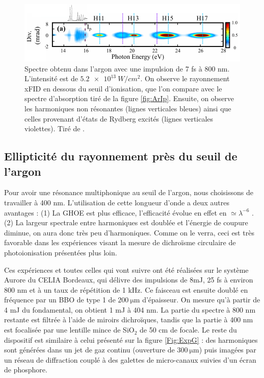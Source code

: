 \begin{figure}[!ht]
\centering
\includegraphics[width=1.1\columnwidth]{Figures/ResonantArgon/xFID.pdf}%
\caption{Spectre obtenu dans l'argon avec une impulsion de 7 fs à 800 nm. L'intensité est de $\SI{5.2e13}{W/cm^2}$. On observe le rayonnement xFID en dessous du seuil d'ionisation, que l'on compare avec le spectre d'absorption tiré de la figure \ref{fig:ArIp}. Ensuite, on observe les harmoniques non résonantes (lignes verticales bleues) ainsi que celles provenant d'états de Rydberg excités (lignes verticales violettes). Tiré de .}
\label{fig:xFID}
\end{figure}



\subsection{Ellipticité du rayonnement près du seuil de l'argon}
\label{sec:resonant_argon_exp}
Pour avoir une résonance multiphonique au seuil de l'argon, nous choisissons de travailler à 400 nm. L'utilisation de cette longueur d'onde a deux autres avantages : (1) La GHOE est plus efficace, l'efficacité évolue en effet en $\simeq\lambda^{-6}$ . (2) La largeur spectrale entre harmoniques est doublée et l'énergie de coupure diminue, on aura donc très peu d'harmoniques. Comme on le verra, ceci est très favorable dans les expériences visant la mesure de dichroïsme circulaire de photoionisation présentées plus loin. 

Ces expériences et toutes celles qui vont suivre ont été réalisées sur le système Aurore du CELIA Bordeaux, qui délivre des impulsions de 8mJ, 25 fs à environ 800 nm et à un taux de répétition de 1 kHz. Ce faisceau est ensuite doublé en fréquence par un BBO de type 1 de $\SI{200}{\micro\meter}$ d'épaisseur. On mesure qu'à partir de 4 mJ du fondamental, on obtient 1 mJ à 404 nm. La partie du spectre à 800 nm restante est filtrée à l'aide de miroirs dichroïques, tandis que la partie à 400 nm est focalisée par une lentille mince de Si$\text{O}_\text{2}$ de 50 cm de focale. Le reste du dispositif est similaire à celui présenté sur la figure \ref{Fig:ExpG} : des harmoniques sont générées dans un jet de gaz continu (ouverture de $\SI{300}{\micro\meter}$) puis imagées par un réseau de diffraction couplé à des galettes de micro-canaux suivies d'un écran de phosphore. 

